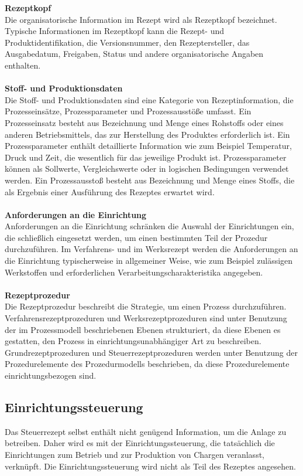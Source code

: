 \textbf{Rezeptkopf}\\
Die organisatorische Information im Rezept wird als Rezeptkopf bezeichnet. Typische Informationen im Rezeptkopf kann die Rezept- und Produktidentifikation, die Versionsnummer, den Rezeptersteller, das Ausgabedatum, Freigaben, Status und andere organisatorische Angaben enthalten.
\\\\
\textbf{Stoff- und Produktionsdaten}\\
Die Stoff- und Produktionsdaten sind eine Kategorie von Rezeptinformation, die Prozesseinsätze, Prozessparameter und Prozessausstöße umfasst.
Ein Prozesseinsatz besteht aus Bezeichnung und Menge eines Rohstoffs oder eines anderen Betriebsmittels, das zur Herstellung des Produktes erforderlich ist.
Ein Prozessparameter enthält detaillierte Information wie zum Beispiel Temperatur, Druck und Zeit, die wesentlich für das jeweilige Produkt ist.  Prozessparameter können als Sollwerte, Vergleichswerte oder in logischen Bedingungen verwendet werden.
Ein Prozessausstoß besteht aus Bezeichnung und Menge eines Stoffs, die als Ergebnis einer Ausführung des Rezeptes erwartet wird.
\\\\
\textbf{Anforderungen an die Einrichtung}\\
Anforderungen an die Einrichtung schränken die Auswahl der Einrichtungen ein, die schließlich eingesetzt werden, um einen bestimmten Teil der Prozedur durchzuführen. Im Verfahrens- und im Werksrezept werden die Anforderungen an die Einrichtung typischerweise in allgemeiner Weise, wie zum Beispiel zulässigen Werkstoffen und erforderlichen Verarbeitungscharakteristika angegeben.
\\\\
\textbf{Rezeptprozedur}\\
Die Rezeptprozedur beschreibt die Strategie, um einen Prozess durchzuführen. Verfahrensrezeptprozeduren und Werksrezeptprozeduren sind unter Benutzung der im Prozessmodell beschriebenen Ebenen strukturiert, da diese Ebenen es gestatten, den Prozess in einrichtungsunabhängiger Art zu beschreiben. Grundrezeptprozeduren und Steuerrezeptprozeduren werden unter Benutzung der Prozedurelemente des Prozedurmodells beschrieben, da diese Prozedurelemente einrichtungsbezogen sind. \cite{batchproc}\\

\subsection{Einrichtungssteuerung}
Das Steuerrezept selbst enthält nicht genügend Information, um die Anlage zu betreiben. Daher wird es mit der Einrichtungssteuerung, die tatsächlich die Einrichtungen zum Betrieb und zur Produktion von Chargen veranlasst, verknüpft. Die Einrichtungssteuerung wird nicht als Teil des Rezeptes angesehen.

